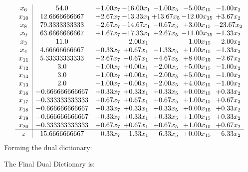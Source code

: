 \documentclass[8pt]{article}
\begin{document}
\[\begin{array}{c| c c@{\hskip 2pt} c@{\hskip 2pt} c@{\hskip 2pt} c@{\hskip 2pt} c@{\hskip 2pt} }
 x_{6}   &  54.0 & +  1.00 x_{7} & -16.00 x_{1} & -1.00 x_{5} & -5.00 x_{15} & -1.00 x_{2}\\
 x_{10}   &  12.6666666667 & +  2.67 x_{7} & -13.33 x_{1} & + 13.67 x_{5} & -12.00 x_{15} & +  3.67 x_{2}\\
 x_{8}   &  79.3333333333 & -2.67 x_{7} & -14.67 x_{1} & -0.67 x_{5} & +  3.00 x_{15} & -23.67 x_{2}\\
 x_{9}   &  63.6666666667 & +  1.67 x_{7} & -17.33 x_{1} & +  2.67 x_{5} & -11.00 x_{15} & -1.33 x_{2}\\
 x_{3}   &  11.0  &   & -2.00 x_{1} &   & -1.00 x_{15} & -2.00 x_{2}\\
 x_{4}   &  4.66666666667 & -0.33 x_{7} & +  0.67 x_{1} & -1.33 x_{5} & +  1.00 x_{15} & -1.33 x_{2}\\
 x_{11}   &  5.33333333333 & -2.67 x_{7} & -0.67 x_{1} & -4.67 x_{5} & +  8.00 x_{15} & -2.67 x_{2}\\
 x_{12}   &  3.0 & -1.00 x_{7} & +  0.00 x_{1} & -2.00 x_{5} & +  5.00 x_{15} & -1.00 x_{2}\\
 x_{14}   &  3.0 & -1.00 x_{7} & +  0.00 x_{1} & -2.00 x_{5} & +  5.00 x_{15} & -1.00 x_{2}\\
 x_{13}   &  2.0 & -1.00 x_{7} & -0.00 x_{1} & -2.00 x_{5} & +  4.00 x_{15} & -1.00 x_{2}\\
 x_{16}   &  -0.666666666667 & +  0.33 x_{7} & +  0.33 x_{1} & +  0.33 x_{5} & +  0.00 x_{15} & +  0.33 x_{2}\\
 x_{17}   &  -0.333333333333 & +  0.67 x_{7} & +  0.67 x_{1} & +  0.67 x_{5} & +  1.00 x_{15} & +  0.67 x_{2}\\
 x_{18}   &  -0.666666666667 & +  0.33 x_{7} & +  0.33 x_{1} & +  0.33 x_{5} & +  0.00 x_{15} & +  0.33 x_{2}\\
 x_{19}   &  -0.666666666667 & +  0.33 x_{7} & +  0.33 x_{1} & +  0.33 x_{5} & +  1.00 x_{15} & +  0.33 x_{2}\\
 x_{20}   &  -0.333333333333 & +  0.67 x_{7} & +  0.67 x_{1} & +  0.67 x_{5} & +  1.00 x_{15} & +  0.67 x_{2}\\
\hline
z    &  15.6666666667 & -0.33 x_{7} & -1.33 x_{1} & -6.33 x_{5} & +  0.00 x_{15} & -6.33 x_{2}\\
\end{array}\]
Forming the dual dictionary:

The Final Dual Dictionary is: 
\end{document}

